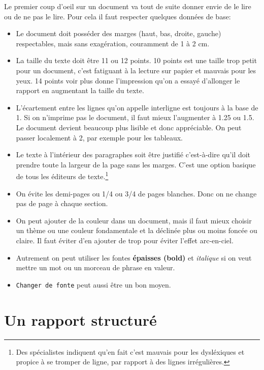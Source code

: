 Le premier coup d'oeil sur un document va tout de suite donner envie de le lire ou 
de ne pas le lire. Pour cela il faut respecter quelques données de base:
\begin{itemize}
\item Le document doit posséder des marges (haut, bas, droite, gauche) respectables, mais sans exagération, couramment de 1 à 2 cm.

\item La taille du texte doit être 11 ou 12 points. 
10 points est une taille trop petit pour un document, c'est fatiguant à la lecture sur papier et mauvais pour les yeux. 14 points voir plus donne l'impression qu'on a essayé  d'allonger le rapport en augmentant la taille du texte.

\item L'écartement entre les lignes qu'on appelle interligne est toujours à la base de 1. Si on n'imprime pas le document, il faut mieux l'augmenter à 1.25 ou 1.5. Le document devient beaucoup plus lisible et donc appréciable. On peut passer localement à 2, par exemple pour les tableaux.

\item Le texte à l'intérieur des paragraphes soit être justifié c'est-à-dire qu'il doit prendre toute la largeur de la page sans les marges.
 C'est une option basique de tous les éditeurs de texte.\footnote{Des spécialistes indiquent qu'en fait c'est mauvais pour les dysléxiques et propice à se tromper de ligne, par rapport à des lignes irrégulières.}
 
\item On évite les demi-pages ou 1/4 ou 3/4 de pages blanches. Donc on ne change pas de page à chaque section.

\item On peut ajouter de la couleur dans un document, mais il faut mieux choisir un thème ou une couleur fondamentale et la déclinée plus ou moins foncée ou claire. Il faut éviter d'en ajouter de trop pour éviter l'effet arc-en-ciel.

\item Autrement on peut utiliser les fontes \textbf{épaisses (bold)} et \textit{italique} si on veut mettre un mot ou un morceau de phrase en valeur.

\item \texttt{Changer de fonte} peut aussi être un bon moyen.
\end{itemize}


\section{Un rapport structuré}

